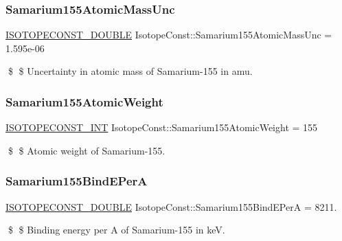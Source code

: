 \subsubsection{\texorpdfstring{Samarium155\+Atomic\+Mass\+Unc}{Samarium155AtomicMassUnc}}
{\footnotesize\ttfamily \mbox{\hyperlink{group___isotope_const-_macros_ga8f45a7272ce02c0b4c65c44636ed719a}{I\+S\+O\+T\+O\+P\+E\+C\+O\+N\+S\+T\+\_\+\+D\+O\+U\+B\+LE}} Isotope\+Const\+::\+Samarium155\+Atomic\+Mass\+Unc = 1.\+595e-\/06}

\$ \$ Uncertainty in atomic mass of Samarium-\/155 in amu. \mbox{\label{group___isotope_const-_samarium-_sm155_gac49b0fb89045d88c6d06f4f7c5751b5b}} 
\subsubsection{\texorpdfstring{Samarium155\+Atomic\+Weight}{Samarium155AtomicWeight}}
{\footnotesize\ttfamily \mbox{\hyperlink{group___isotope_const-_macros_ga5f18360b3e99483a35c32d789e62621c}{I\+S\+O\+T\+O\+P\+E\+C\+O\+N\+S\+T\+\_\+\+I\+NT}} Isotope\+Const\+::\+Samarium155\+Atomic\+Weight = 155}

\$ \$ Atomic weight of Samarium-\/155. \mbox{\label{group___isotope_const-_samarium-_sm155_ga5a901635eccb287f6b865e9390ea96af}} 
\subsubsection{\texorpdfstring{Samarium155\+Bind\+E\+PerA}{Samarium155BindEPerA}}
{\footnotesize\ttfamily \mbox{\hyperlink{group___isotope_const-_macros_ga8f45a7272ce02c0b4c65c44636ed719a}{I\+S\+O\+T\+O\+P\+E\+C\+O\+N\+S\+T\+\_\+\+D\+O\+U\+B\+LE}} Isotope\+Const\+::\+Samarium155\+Bind\+E\+PerA = 8211.}

\$ \$ Binding energy per A of Samarium-\/155 in keV. \mbox{\label{group___isotope_const-_samarium-_sm155_gadfca54ccb2c6dc60ea5e20b762d8c8c9}} 
